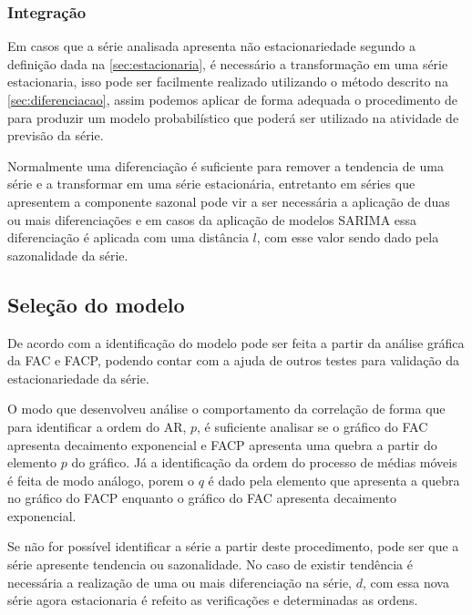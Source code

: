 \documentclass[
    12pt,
    oneside,
    a4paper,
    english,
    brazil
]{abntex2}
\begin{document}
\subsubsection{Integração}

Em  casos  que a  série  analisada  apresenta  não estacionariedade  segundo  a
definição dada  na \autoref{sec:estacionaria}, é necessário  a transformação em
uma  série  estacionaria,  isso  pode ser  facilmente  realizado  utilizando  o
método  descrito  na  \autoref{sec:diferenciacao},  assim  podemos  aplicar  de
forma  adequada o  procedimento  de   para  produzir um  modelo
probabilístico que poderá ser utilizado na atividade de previsão da série.

Normalmente  uma diferenciação  é suficiente  para remover  a tendencia  de uma
série  e a  transformar em  uma série  estacionária, entretanto  em séries  que
apresentem a componente  sazonal pode vir a ser necessária  a aplicação de duas
ou  mais  diferenciações  e  em  casos da  aplicação  de  modelos  SARIMA  essa
diferenciação é aplicada com uma distância  $l$, com esse valor sendo dado pela
sazonalidade da série.

\subsection{Seleção do modelo}

De  acordo com   a  identificação do  modelo pode  ser feita  a
partir da análise gráfica  da FAC e FACP, podendo contar com  a ajuda de outros
testes para validação da estacionariedade da série.

O modo que   desenvolveu análise o  comportamento da correlação
de forma que  para identificar a ordem  do AR, $p$, é suficiente  analisar se o
gráfico do FAC  apresenta decaimento exponencial e FACP apresenta  uma quebra a
partir do elemento $p$  do gráfico. Já a identificação da  ordem do processo de
médias móveis  é feita de modo  análogo, porem o  $q$ é dado pela  elemento que
apresenta  a quebra  no gráfico  do FACP  enquanto o  gráfico do  FAC apresenta
decaimento exponencial.

Se não for  possível identificar a série a partir  deste procedimento, pode ser
que a série apresente tendencia ou sazonalidade. No caso de existir tendência é
necessária a  realização de uma ou  mais diferenciação na série,  $d$, com essa
nova  série agora  estacionaria é  refeito  as verificações  e determinadas  as
ordens.
\end{document}

